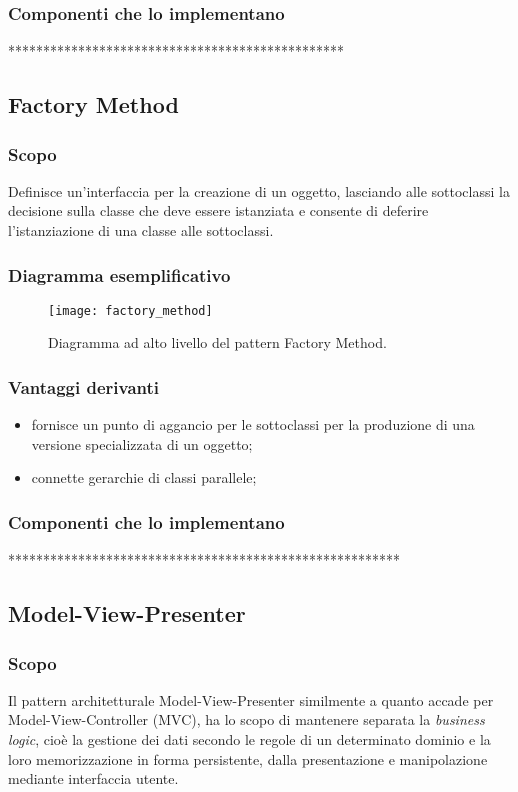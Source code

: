 \subsubsection{Componenti che lo implementano}
\item *************************************************

\subsection{Factory Method}
\subsubsection{Scopo}
Definisce un'interfaccia per la creazione di un oggetto, lasciando alle sottoclassi la decisione sulla classe che deve essere istanziata e consente di deferire l'istanziazione di una classe alle sottoclassi.
\subsubsection{Diagramma esemplificativo}
\begin{figure}[h]
\centering
\texttt{[image: factory\_method]}
\caption{Diagramma ad alto livello del pattern Factory Method.}\label{fig:factory_method}
\end{figure}
\subsubsection{Vantaggi derivanti}
\begin{itemize}
\item fornisce un punto di aggancio per le sottoclassi per la produzione di una versione specializzata di un oggetto;
\item connette gerarchie di classi parallele;
\end{itemize}
\subsubsection{Componenti che lo implementano}
\item *********************************************************

\subsection{Model-View-Presenter}
\subsubsection{Scopo}
Il pattern architetturale \foreignlanguage{english}{Model-View-Presenter} similmente a quanto accade per \foreignlanguage{english}{Model-View-Controller} (MVC), ha lo scopo di mantenere separata la \textit{business logic}, cioè la gestione dei dati secondo le regole di un determinato dominio e la loro memorizzazione in forma persistente, dalla presentazione e manipolazione mediante interfaccia utente.
